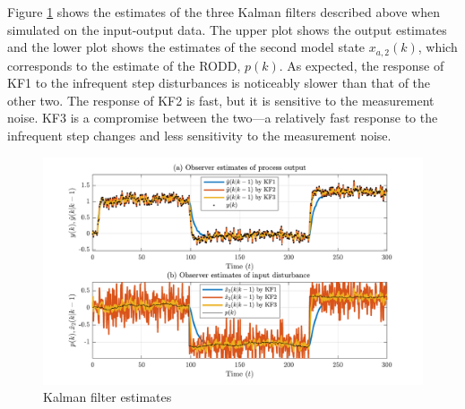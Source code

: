 Figure \ref{fig:sim-sys-siso-KF123-est} shows the estimates of the three Kalman filters described above when simulated on the input-output data. The upper plot shows the output estimates and the lower plot shows the estimates of the second model state $x_{a,2}(k)$, which corresponds to the estimate of the \gls{RODD}, $p(k)$. As expected, the response of KF1 to the infrequent step disturbances is noticeably slower than that of the other two. The response of KF2 is fast, but it is sensitive to the measurement noise. KF3 is a compromise between the two—a relatively fast response to the infrequent step changes and less sensitivity to the measurement noise.
\begin{figure}[htp]
	\centering
	\includegraphics[width=13cm]{images/rod_obs_sim1_y_est1.pdf}
	\caption{Kalman filter estimates}
	\label {fig:sim-sys-siso-KF123-est}
\end{figure}

